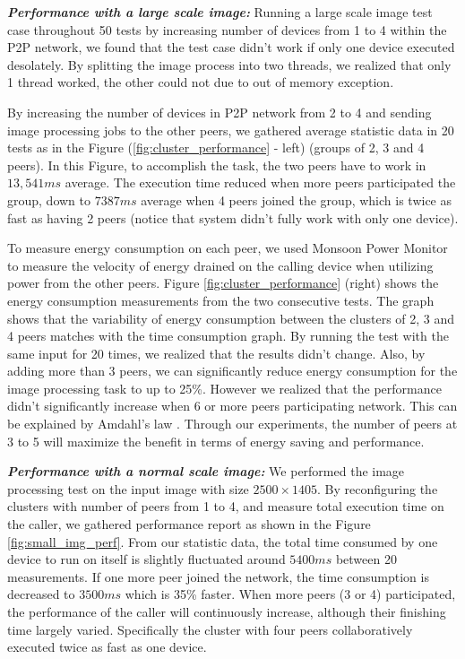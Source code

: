 \documentclass{sig-alternate}
\begin{document}
\textbf{\emph{Performance with a large scale image:}}
Running a large scale image test case throughout 50 tests by increasing number of devices from 1 to 4 within the P2P network, we found that the test case didn't work if only one device executed desolately. By splitting the image process into two threads, we realized that only 1 thread worked, the other could not due to out of memory exception. 

By increasing the number of devices in P2P network from 2 to 4 and sending image processing jobs to the other peers, we gathered average statistic data in 20 tests as in the Figure (\ref{fig:cluster_performance} - left) (groups of 2, 3 and 4 peers). In this Figure, to accomplish the task, the two peers have to work in $13,541ms$ average. The execution time reduced when more peers participated the group, down to $7387ms$ average when 4 peers joined the group, which is twice as fast as having 2 peers (notice that system didn't fully work with only one device).

To measure energy consumption on each peer, we used Monsoon Power Monitor \cite{moosoon} to measure the velocity of energy drained on the calling device when utilizing power from the other peers. Figure \ref{fig:cluster_performance} (right) shows the energy consumption measurements from the two consecutive tests. The graph shows that the variability of energy consumption between the clusters of 2, 3 and 4 peers matches with the time consumption graph. By running the test with the same input for 20 times, we realized that the results didn't change. Also, by adding more than 3 peers, we can significantly reduce energy consumption for the image processing task to up to 25\%. However we realized that the performance didn't significantly increase when 6 or more peers participating network. This can be explained by Amdahl's law \cite{amdahl}. Through our experiments, the number of peers at 3 to 5 will maximize the benefit in terms of energy saving and performance.

\textbf{\emph{Performance with a normal scale image:}}
We performed the image processing test on the input image with size $2500 \times 1405$. By reconfiguring the clusters with number of peers from 1 to 4, and measure total execution time on the caller, we gathered performance report as shown in the Figure \ref{fig:small_img_perf}. From our statistic data, the total time consumed by one device to run on itself is slightly fluctuated around $5400ms$ between 20 measurements. If one more peer joined the network, the time consumption is decreased to $3500ms$ which is 35\% faster. When more peers (3 or 4) participated, the performance of the caller will continuously increase, although their finishing time largely varied. Specifically the cluster with four peers collaboratively executed twice as fast as one device.
\end{document}
